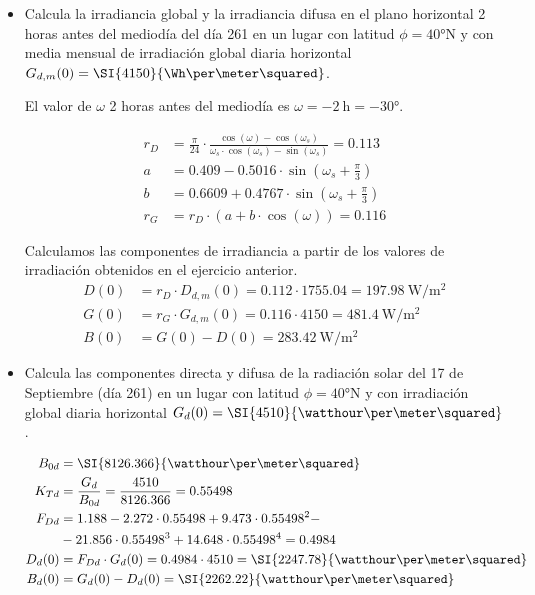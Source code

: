 \begin{itemize}
\item Calcula la irradiancia global y la irradiancia difusa en el
  plano horizontal 2 horas antes del mediodía del día 261 en un lugar
  con latitud $\phi=\ang{40}\mathrm{N}$ y con media mensual de
  irradiación global diaria horizontal
  $G_{d,m}(0)=\SI{4150}{\Wh\per\meter\squared}$.

  El valor de $\omega$ 2 horas antes del mediodía es
  $\omega = \SI{-2}{\hour} = \ang{-30}.$

\begin{align*}
  r_{D} &= \frac{\pi}{24}\cdot\frac{\cos(\omega)-\cos(\omega_{s})}{\omega_{s}\cdot\cos(\omega_{s})-\sin(\omega_{s})} = 0.113\\
  a &= 0.409-0.5016\cdot\sin(\omega_{s}+\frac{\pi}{3})\\
  b &= 0.6609+0.4767\cdot\sin(\omega_{s}+\frac{\pi}{3})\\
  r_{G} &= r_{D}\cdot\left(a + b\cdot\cos(\omega)\right) = 0.116
\end{align*}

Calculamos las componentes de irradiancia a partir de los valores de irradiación obtenidos en el ejercicio anterior.
\begin{align*}
  D(0) &= r_D \cdot D_{d,m}(0) = 0.112 \cdot 1755.04 = \SI{197.98}{\watt\per\meter\squared}\\
  G(0) &= r_G \cdot G_{d,m}(0) = 0.116 \cdot 4150 = \SI{481.4}{\watt\per\meter\squared}\\
  B(0) &= G(0) - D(0) = \SI{283.42}{\watt\per\meter\squared}
\end{align*}

\item Calcula las componentes directa y difusa de la radiación solar
  del 17 de Septiembre (día 261) en un lugar con latitud
  $\phi=\ang{40}\mathrm{N}$ y con irradiación global diaria horizontal
  $G_d(0)=\SI{4510}{\watthour\per\meter\squared}$.

\begin{align*}
  B_{0d} &= \SI{8126.366}{\watthour\per\meter\squared}\\
  K_{Td} &= \frac{G_{d}}{B_{0d}} = \frac{4510}{8126.366} = 0.55498\\
  F_{Dd} &= 1.188 - 2.272 \cdot 0.55498 + 9.473 \cdot 0.55498^{2} -\\
         &- 21.856 \cdot 0.55498^{3} + 14.648 \cdot 0.55498^{4} = 0.4984\\
  D_d(0) &= F_{Dd} \cdot G_d(0) = 0.4984 \cdot 4510 = \SI{2247.78}{\watthour\per\meter\squared}\\
  B_d(0) &= G_d(0) - D_d(0) = \SI{2262.22}{\watthour\per\meter\squared}
\end{align*}

\end{itemize}
